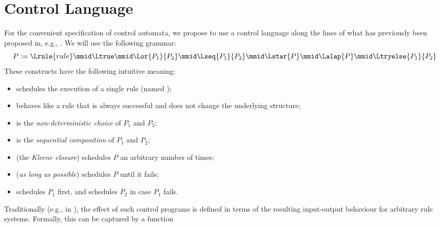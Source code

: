 \section{Control Language}\label{sec:language}


For the convenient specification of control automata, we propose to use a
control language along the lines of what has previously been proposed in, e.g.,
\cite{HabelPlump01}. We will use the following grammar:
%
\[ P := \Lrule{rule} \mmid \Ltrue \mmid \Lor{P_1}{P_2} \mmid \Lseq{P_1}{P_2} \mmid
\Lstar{P} \mmid \Lalap{P} \mmid \Ltryelse{P_1}{P_2} 
\]
%
These constructs have the following intuitive meaning:
\begin{itemize}
\item {} schedules the execution of a single rule (named
  );
\item \Ltrue{} behaves like a rule that is always successful
  and does not change the underlying structure;
\item {} is the \emph{non-deterministic choice} of $P_1$ and $P_2$;
\item {} is the \emph{sequential composition} of $P_1$ and $P_2$;
\item {} (the \emph{Kleene closure}) schedules $P$ an arbitrary number
  of times;
\item {} (\emph{as long as possible}) schedules $P$ until it fails;
\item {} schedules $P_1$ first, and schedules $P_2$ in case
  $P_1$ fails.
\end{itemize}
%
Traditionally (e.g., in \cite{HabelPlump01}), the effect of such control
programs is defined in terms of the resulting input-output behaviour for
arbitrary rule systems. Formally, this can be captured by a function
